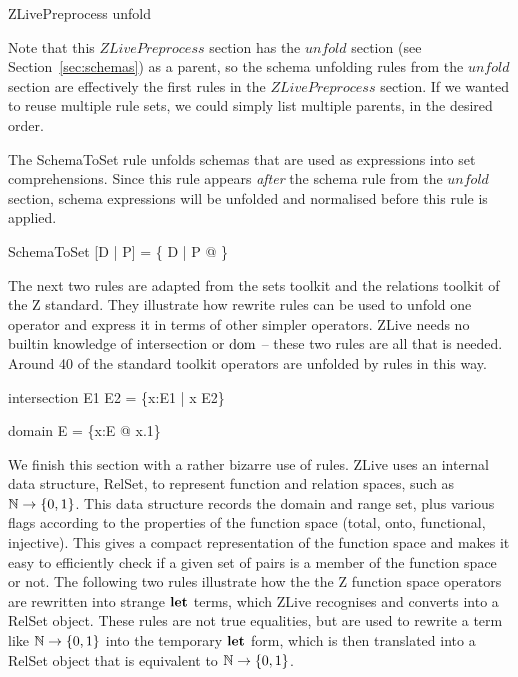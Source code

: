 \documentclass{entcs}
\begin{document}
\begin{zsection}
  \SECTION ZLivePreprocess \parents unfold
\end{zsection}

Note that this $ZLivePreprocess$ section has the $unfold$ section (see
Section~\ref{sec:schemas}) as a parent, so the schema unfolding rules
from the $unfold$ section are effectively the first rules in the
$ZLivePreprocess$ section.  If we wanted to reuse multiple rule sets,
we could simply list multiple parents, in the desired order.

The SchemaToSet rule unfolds schemas that are used as expressions into
set comprehensions.  Since this rule appears \emph{after} the schema
rule from the $unfold$ section, schema expressions will be unfolded
and normalised before this rule is applied. 
\begin{zedrule}{SchemaToSet}
[D | P] = \{ D | P @ \theta [D | true] \}
\end{zedrule}

The next two rules are adapted from the sets toolkit and the
relations toolkit of the Z standard.  They illustrate how rewrite rules
can be used to unfold one operator and express it in terms of other
simpler operators.  ZLive needs no builtin knowledge of intersection
or $\mathop{\mathstrut{\mbox{\textrm{dom}}}}\nolimits$ -- these two rules are all that is needed.  Around 40 of the
standard toolkit operators are unfolded by rules in this way.

\begin{zedrule}{intersection}
   E1 \cap E2 = \{x:E1 | x \in E2\}
\end{zedrule}
\begin{zedrule}{domain}
   \dom E = \{x:E @ x.1\}
\end{zedrule}

We finish this section with a rather bizarre use of rules.  ZLive uses
an internal data structure, RelSet, to represent function and relation
spaces, such as $\nat \fun \{0,1\}$.  This data structure records the
domain and range set, plus various flags according to the properties
of the function space (total, onto, functional, injective).  This
gives a compact representation of the function space and makes it easy
to efficiently check if a given set of pairs is a member of the
function space or not.  The following two rules illustrate how the the
Z function space operators are rewritten into strange $\mathop{\mathstrut{\mbox{\textbf{let}}}}\nolimits$ terms,
which ZLive recognises and converts into a RelSet object.  These rules
are not true equalities, but are used to rewrite a term like $\nat
\fun \{0,1\}$ into the temporary $\mathop{\mathstrut{\mbox{\textbf{let}}}}\nolimits$ form, which is then translated
into a RelSet object that is equivalent to $\nat \fun \{0,1\}$.
\end{document}
